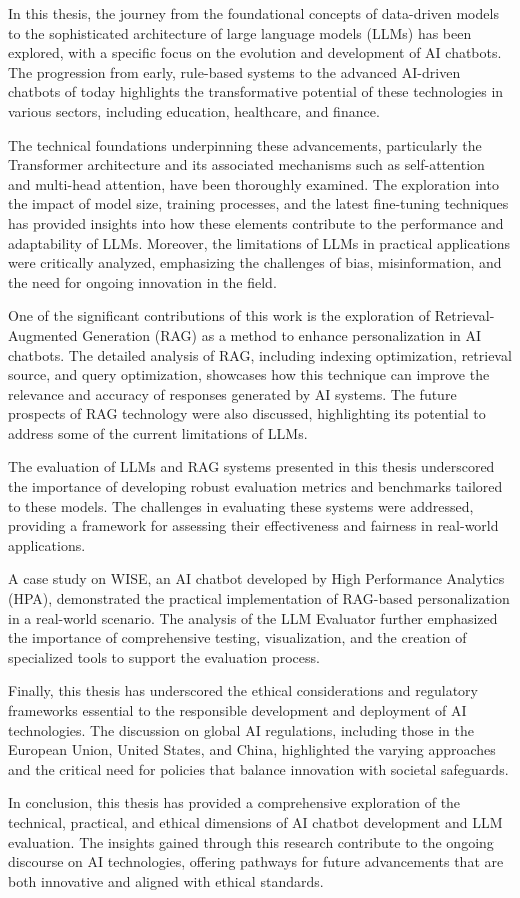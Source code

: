 In this thesis, the journey from the foundational concepts of data-driven models to the sophisticated architecture of large language models (LLMs) has been explored, with a specific focus on the evolution and development of AI chatbots. The progression from early, rule-based systems to the advanced AI-driven chatbots of today highlights the transformative potential of these technologies in various sectors, including education, healthcare, and finance.

The technical foundations underpinning these advancements, particularly the Transformer architecture and its associated mechanisms such as self-attention and multi-head attention, have been thoroughly examined. The exploration into the impact of model size, training processes, and the latest fine-tuning techniques has provided insights into how these elements contribute to the performance and adaptability of LLMs. Moreover, the limitations of LLMs in practical applications were critically analyzed, emphasizing the challenges of bias, misinformation, and the need for ongoing innovation in the field.

One of the significant contributions of this work is the exploration of Retrieval-Augmented Generation (RAG) as a method to enhance personalization in AI chatbots. The detailed analysis of RAG, including indexing optimization, retrieval source, and query optimization, showcases how this technique can improve the relevance and accuracy of responses generated by AI systems. The future prospects of RAG technology were also discussed, highlighting its potential to address some of the current limitations of LLMs.

The evaluation of LLMs and RAG systems presented in this thesis underscored the importance of developing robust evaluation metrics and benchmarks tailored to these models. The challenges in evaluating these systems were addressed, providing a framework for assessing their effectiveness and fairness in real-world applications.

A case study on WISE, an AI chatbot developed by High Performance Analytics (HPA), demonstrated the practical implementation of RAG-based personalization in a real-world scenario. The analysis of the LLM Evaluator further emphasized the importance of comprehensive testing, visualization, and the creation of specialized tools to support the evaluation process.

Finally, this thesis has underscored the ethical considerations and regulatory frameworks essential to the responsible development and deployment of AI technologies. The discussion on global AI regulations, including those in the European Union, United States, and China, highlighted the varying approaches and the critical need for policies that balance innovation with societal safeguards.

In conclusion, this thesis has provided a comprehensive exploration of the technical, practical, and ethical dimensions of AI chatbot development and LLM evaluation. The insights gained through this research contribute to the ongoing discourse on AI technologies, offering pathways for future advancements that are both innovative and aligned with ethical standards.
